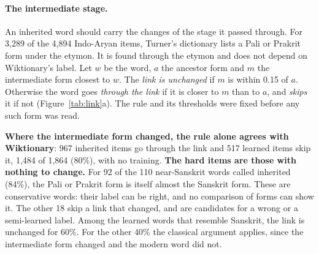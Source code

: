 \documentclass[11pt]{article}
\begin{document}
\paragraph{The intermediate stage.} An inherited word should carry the changes of the stage it passed through. For 3,289 of the 4,894 Indo-Aryan items, Turner's dictionary lists a Pali or Prakrit form under the etymon. It is found through the etymon and does not depend on Wiktionary's label. Let $w$ be the word, $a$ the ancestor form and $m$ the intermediate form closest to $w$. The \textit{link is unchanged} if $m$ is within 0.15 of $a$. Otherwise the word goes \textit{through the link} if it is closer to $m$ than to $a$, and \textit{skips} it if not (Figure~\ref{tab:link}a). The rule and its thresholds were fixed before any such form was read.

\textbf{Where the intermediate form changed, the rule alone agrees with Wiktionary}: 967 inherited items go through the link and 517 learned items skip it, 1,484 of 1,864 (80\%), with no training. \textbf{The hard items are those with nothing to change.} For 92 of the 110 near-Sanskrit words called inherited (84\%), the Pali or Prakrit form is itself almost the Sanskrit form. These are conservative words: their label can be right, and no comparison of forms can show it. The other 18 skip a link that changed, and are candidates for a wrong or a semi-learned label. Among the learned words that resemble Sanskrit, the link is unchanged for 60\%. For the other 40\% the classical argument applies, since the intermediate form changed and the modern word did not.
\end{document}
